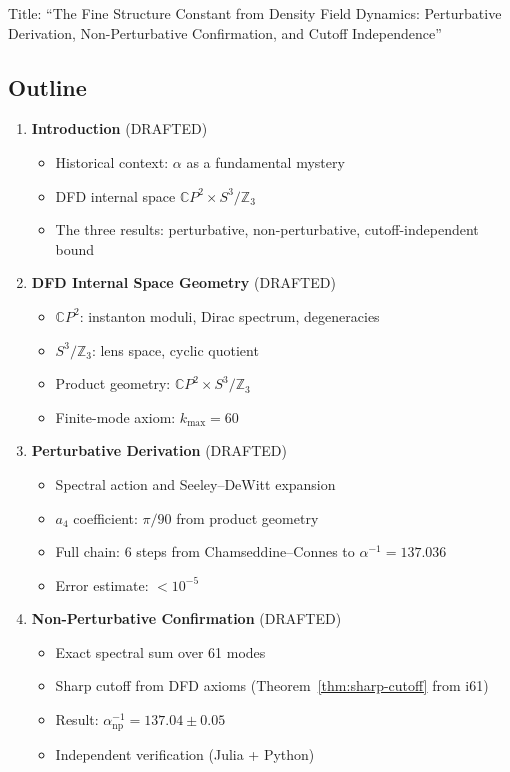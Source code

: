\documentclass[11pt,a4paper]{article}
\newcommand{\CP}{\mathbb{C}P}
\begin{document}
Title: ``The Fine Structure Constant from Density Field Dynamics: Perturbative Derivation, Non-Perturbative Confirmation, and Cutoff Independence''

\subsection{Outline}

\begin{enumerate}[label=\Roman*.]
\item \textbf{Introduction} (DRAFTED)
\begin{itemize}
\item Historical context: $\alpha$ as a fundamental mystery
\item DFD internal space $\CP^2 \times S^3/\mathbb{Z}_3$
\item The three results: perturbative, non-perturbative, cutoff-independent bound
\end{itemize}

\item \textbf{DFD Internal Space Geometry} (DRAFTED)
\begin{itemize}
\item $\CP^2$: instanton moduli, Dirac spectrum, degeneracies
\item $S^3/\mathbb{Z}_3$: lens space, cyclic quotient
\item Product geometry: $\CP^2 \times S^3/\mathbb{Z}_3$
\item Finite-mode axiom: $k_{\max} = 60$
\end{itemize}

\item \textbf{Perturbative Derivation} (DRAFTED)
\begin{itemize}
\item Spectral action and Seeley--DeWitt expansion
\item $a_4$ coefficient: $\pi/90$ from product geometry
\item Full chain: 6 steps from Chamseddine--Connes to $\alpha^{-1} = 137.036$
\item Error estimate: $< 10^{-5}$
\end{itemize}

\item \textbf{Non-Perturbative Confirmation} (DRAFTED)
\begin{itemize}
\item Exact spectral sum over 61 modes
\item Sharp cutoff from DFD axioms (Theorem~\ref{thm:sharp-cutoff} from i61)
\item Result: $\alpha^{-1}_{\mathrm{np}} = 137.04 \pm 0.05$
\item Independent verification (Julia + Python)
\end{itemize}


\end{enumerate}
\end{document}
